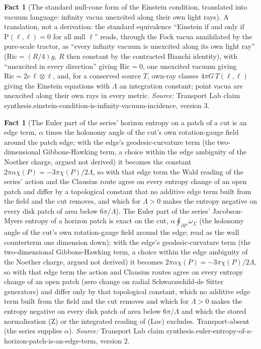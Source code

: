 \documentclass[11pt]{article}
\theoremstyle{definition}
\newtheorem{fact}[theorem]{Fact}
\theoremstyle{plain}
\providecommand{\Ric}{}\renewcommand{\Ric}{\mathrm{Ric}}
\providecommand{\Sch}{}\renewcommand{\Sch}{\mathrm{P}}
\begin{document}
\begin{fact}[The standard null-cone form of the Einstein condition, translated into vacuum language: infinity vacua unexcited along their own light rays]\label{c:synthesis.einstein-condition-is-infinity-vacuum-incidence}
A translation, not a derivation: the standard equivalence ``Einstein if and only if $\Sch(\ell,\ell) = 0$ for all null $\ell$'' reads, through the Fock vacua annihilated by the pure-scale tractor, as ``every infinity vacuum is unexcited along its own light ray'' ($\Ric = (R/4)g$, $R$ then constant by the contracted Bianchi identity), with ``unexcited in every direction'' giving $\Ric = 0$, one unexcited vacuum giving $\Ric = 2c\,\ell\otimes\ell$, and, for a conserved source $T$, own-ray classes $4\pi G\,T(\ell,\ell)$ giving the Einstein equations with $\Lambda$ an integration constant; point vacua are unexcited along their own rays in every metric.
\emph{Source:} Transport Lab claim synthesis.einstein-condition-is-infinity-vacuum-incidence, version 3.
\end{fact}

\begin{fact}[The Euler part of the series' horizon entropy on a patch of a cut is an edge term, $\alpha$ times the holonomy angle of the cut's own rotation-gauge field around the patch edge; with the edge's geodesic-curvature term (the two-dimensional Gibbons-Hawking term, a choice within the edge ambiguity of the Noether charge, argued not derived) it becomes the constant $2\pi\alpha\chi(P) = -3\pi\chi(P)/2\Lambda$, so with that edge term the Wald reading of the series' action and the Clausius route agree on every entropy change of an open patch and differ by a topological constant that no additive edge term built from the field and the cut removes, and which for $\Lambda > 0$ makes the entropy negative on every disk patch of area below $6\pi/\Lambda$]\label{c:synthesis.euler-entropy-of-a-horizon-patch-is-an-edge-term}
The Euler part of the series' Jacobson-Myers entropy of a horizon patch is exact on the cut, $\alpha\oint_{\partial P}\omega_{\Sigma}$ (the holonomy angle of the cut's own rotation-gauge field around the edge; read as the wall counterterm one dimension down); with the edge's geodesic-curvature term (the two-dimensional Gibbons-Hawking term, a choice within the edge ambiguity of the Noether charge, argued not derived) it becomes $2\pi\alpha\chi(P) = -3\pi\chi(P)/2\Lambda$, so with that edge term the action and Clausius routes agree on every entropy change of an open patch (zero change on radial Schwarzschild-de Sitter generators) and differ only by that topological constant, which no additive edge term built from the field and the cut removes and which for $\Lambda > 0$ makes the entropy negative on every disk patch of area below $6\pi/\Lambda$ and which the stored normalisation (Z) or the integrated reading of (Loc) excludes. Transport-absent (the series supplies $\alpha$).
\emph{Source:} Transport Lab claim synthesis.euler-entropy-of-a-horizon-patch-is-an-edge-term, version 2.
\end{fact}
\end{document}
